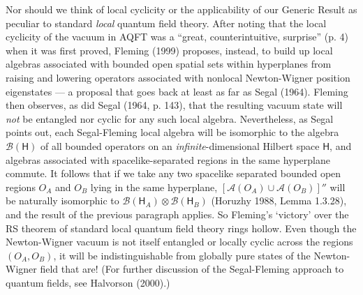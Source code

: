 \documentclass[12pt]{article}
\newcommand{\alg}[1]{\mbox{$\mathcal{#1}$}}
\newcommand{\hil}[1]{\mbox{$\mathsf{#1}$}}
\begin{document}
Nor should we think of local cyclicity or the applicability of our  
Generic Result as peculiar to standard  
\emph{local} quantum field theory.
 After noting that the local cyclicity of the vacuum in AQFT was a 
``great, counterintuitive, surprise'' (p. 4) when it was first proved,  Fleming (1999) 
proposes, instead, to build up local algebras 
associated with bounded open spatial sets within hyperplanes from 
raising and lowering operators associated with nonlocal 
Newton-Wigner position eigenstates --- a proposal that goes back at 
least as far as Segal (1964).  Fleming then observes, as did Segal 
(1964, p. 143), that the 
resulting vacuum state will \emph{not} be entangled nor cyclic for 
any such local algebra.  Nevertheless, 
as Segal points out, each Segal-Fleming local 
algebra will be isomorphic to the algebra $\alg{B}(\hil{H})$ of all bounded operators on an 
\emph{infinite}-dimensional Hilbert space $\hil{H}$, and algebras associated with 
spacelike-separated regions in 
the same hyperplane commute.  It follows that if we take 
any two spacelike separated bounded open regions $O_{A}$ and $O_{B}$ lying in the same 
hyperplane, $[\alg{A}(O_{A})\cup \alg{A}(O_{B})]''$ will be
 naturally isomorphic to 
 $\alg{B}(\hil{H}_{A})\otimes\alg{B}(\hil{H}_{B})$ (Horuzhy 1988, 
 Lemma 1.3.28), and the result 
of the previous paragraph applies.  So 
Fleming's `victory' over the RS theorem of standard local quantum 
field theory rings hollow. Even though the Newton-Wigner 
vacuum is not itself entangled or locally cyclic across the regions 
$(O_{A},O_{B})$, it will be 
indistinguishable from globally pure states of the Newton-Wigner 
field that are!  (For further discussion of the Segal-Fleming 
approach to quantum fields, see Halvorson (2000).) 
\end{document}
